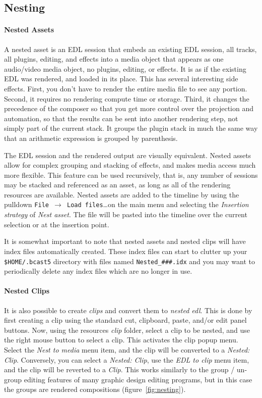 \subsection{Nesting}%
\label{sub:nesting}

\paragraph{Nested Assets} A nested asset is an EDL session that embeds an existing EDL session, all tracks, all plugins, editing, and effects into a media object that appears as one audio/video media object, no plugins, editing, or effects.  It is as if the existing EDL was rendered, and loaded in its place.  This has several interesting side effects.  First, you don’t have to render the entire media file to see any portion.  Second, it requires no rendering compute time or storage.  Third, it changes the precedence of the composer so that you get more control over the projection and automation, so that the results can be sent into another rendering step, not simply part of the current stack.  It groups the plugin stack in much the same way that an arithmetic expression is grouped by parenthesis.

The EDL session and the rendered output are visually equivalent.  Nested assets allow for complex grouping and stacking of effects, and makes media access much more flexible.  This feature can be used recursively, that is, any number of sessions may be stacked and referenced as an asset, as long as all of the rendering resources are available.  Nested assets are added to the timeline by using the pulldown \texttt{File $\rightarrow$ Load files}\dots on the main menu and selecting the \textit{Insertion strategy} of \textit{Nest asset}. The file will be pasted into the timeline over the current selection or at the insertion point.

It is somewhat important to note that nested assets and nested clips will have index files automatically created.  These index files can start to clutter up your \texttt{\$HOME/.bcast5} directory with files named \texttt{Nested\_\#\#\#.idx} and you may want to periodically delete any index files which are no longer in use.

\paragraph{Nested Clips} It is also possible to create \textit{clips} and convert them to \textit{nested edl}.  This is done by first creating a clip using the standard cut, clipboard, paste, and/or edit panel buttons.  Now, using the resources \textit{clip} folder, select a clip to be nested, and use the right mouse button to select a clip.  This activates the clip popup menu.  Select the \textit{Nest to media} menu item, and the clip will be converted to a \textit{Nested: Clip}. Conversely, you can select a \textit{Nested: Clip}, use the \textit{EDL to clip} menu item, and the clip will be reverted to a \textit{Clip}.  This works similarly to the group / un-group editing features of many graphic design editing programs, but in this case the groups are rendered compositions (figure~\ref{fig:nesting}).

